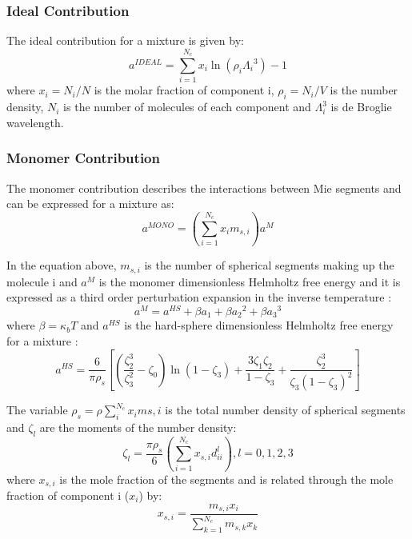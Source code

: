 \subsubsection{Ideal Contribution}

The ideal contribution for a mixture is given by:
\begin{equation}
a^{IDEAL} = \sum_{i=1}^{N_{c}} x_{i}\ln{(\rho_{i}{\Lambda_{i}}^3)} -1
\label{eqn:aideal}
\end{equation}
where $x_{i}=N_{i}/N$ is the molar fraction of component i, $\rho_{i}=N_{i}/V$ is the number density, $N_{i}$ is the number of molecules of each component and $\Lambda_{i}^3$ is de Broglie wavelength. 

\subsubsection{Monomer Contribution}

The monomer contribution describes the interactions between Mie segments and can be expressed for a mixture as:
\begin{equation}
a^{MONO} = \left(\sum_{i=1}^{N_{c}} x_{i}m_{s,i} \right)a^{M}
\label{eqn:amonomer}
\end{equation}

In the equation above, $m_{s,i}$ is the number of spherical segments making up the molecule i and $a^{M}$  is the monomer dimensionless Helmholtz free energy and it is expressed as a third order perturbation expansion in the inverse temperature \cite{bh1976}:
\begin{equation}
a^{M} = a^{HS}+\beta{a_{1}}+\beta{a_{2}}^2+\beta{a_{3}}^3 
\label{eqn:aM}
\end{equation}
where $\beta=\kappa_{b}T$ and $a^{HS}$ is the hard-sphere dimensionless Helmholtz free energy for a mixture :
\begin{equation}
a^{HS} = \frac{6}{\pi\rho_{s}}\left[\left(\frac{\zeta^3_2}{\zeta^2_3}-\zeta_0 \right)\ln(1-\zeta_3)+\frac{3\zeta_{1}\zeta_{2}}{1-\zeta_3}+ \frac{\zeta^3_2}{\zeta_{3}(1-\zeta_3)^2}\right]
\label{eqn:hs}
\end{equation}

The variable $\rho_{s}=\rho\sum_{i}^{N_c} x_{i}m{s,i}$ is the total number density of spherical segments and $\zeta_l$ are the moments of the number density:
\begin{equation}
\zeta_l = \frac{\pi\rho_s}{6}\left(\sum_{i=1}^{N_c} x_{s,i}d^l_{ii} \right), l = 0,1,2,3
\label{eqn:zetal}
\end{equation}
where $x_{s,i}$ is the mole fraction of the segments and is related through the mole fraction of component i ($x_i$) by:
\begin{equation}
x_{s,i} = \frac{m_{s,i}x_i}{\sum_{k=1}^{N_c} m_{s,k}x_{k} }
\label{eqn:xsi}
\end{equation}


